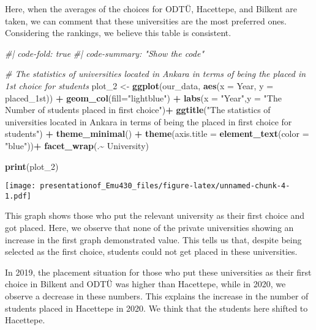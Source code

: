 \documentclass[
]{article}
\newenvironment{Shaded}{\begin{snugshade}}{\end{snugshade}}
\newcommand{\AttributeTok}[1]{\textcolor[rgb]{0.13,0.29,0.53}{#1}}
\newcommand{\CommentTok}[1]{\textcolor[rgb]{0.56,0.35,0.01}{\textit{#1}}}
\newcommand{\FunctionTok}[1]{\textcolor[rgb]{0.13,0.29,0.53}{\textbf{#1}}}
\newcommand{\NormalTok}[1]{#1}
\newcommand{\OtherTok}[1]{\textcolor[rgb]{0.56,0.35,0.01}{#1}}
\newcommand{\SpecialCharTok}[1]{\textcolor[rgb]{0.81,0.36,0.00}{\textbf{#1}}}
\newcommand{\StringTok}[1]{\textcolor[rgb]{0.31,0.60,0.02}{#1}}
\begin{document}
Here, when the averages of the choices for ODTÜ, Hacettepe, and Bilkent
are taken, we can comment that these universities are the most preferred
ones. Considering the rankings, we believe this table is consistent.

\begin{Shaded}
\begin{Highlighting}[]
\CommentTok{\#| code{-}fold: true}
\CommentTok{\#| code{-}summary: "Show the code"}

\CommentTok{\# The statistics of universities located in Ankara in terms of being the placed in 1st choice for students}
\NormalTok{plot\_2 }\OtherTok{\textless{}{-}} \FunctionTok{ggplot}\NormalTok{(our\_data, }\FunctionTok{aes}\NormalTok{(}\AttributeTok{x =}\NormalTok{ Year, }\AttributeTok{y =}\NormalTok{ placed\_1st)) }\SpecialCharTok{+} 
  \FunctionTok{geom\_col}\NormalTok{(}\AttributeTok{fill=}\StringTok{"lightblue"}\NormalTok{) }\SpecialCharTok{+}
 \FunctionTok{labs}\NormalTok{(}\AttributeTok{x =} \StringTok{"Year"}\NormalTok{,}\AttributeTok{y =} \StringTok{"The Number of students placed in first choice"}\NormalTok{)}\SpecialCharTok{+}
  \FunctionTok{ggtitle}\NormalTok{(}\StringTok{"The statistics of universities located in Ankara in terms of being the placed in first choice for students"}\NormalTok{) }\SpecialCharTok{+}
  \FunctionTok{theme\_minimal}\NormalTok{() }\SpecialCharTok{+}
  \FunctionTok{theme}\NormalTok{(}\AttributeTok{axis.title =} \FunctionTok{element\_text}\NormalTok{(}\AttributeTok{color =} \StringTok{"blue"}\NormalTok{))}\SpecialCharTok{+}
  \FunctionTok{facet\_wrap}\NormalTok{(.}\SpecialCharTok{\textasciitilde{}}\NormalTok{ University)}

\FunctionTok{print}\NormalTok{(plot\_2)}
\end{Highlighting}
\end{Shaded}

\texttt{[image: presentationof\_Emu430\_files/figure-latex/unnamed-chunk-4-1.pdf]}

This graph shows those who put the relevant university as their first
choice and got placed. Here, we observe that none of the private
universities showing an increase in the first graph demonstrated value.
This tells us that, despite being selected as the first choice, students
could not get placed in these universities.

In 2019, the placement situation for those who put these universities as
their first choice in Bilkent and ODTÜ was higher than Hacettepe, while
in 2020, we observe a decrease in these numbers. This explains the
increase in the number of students placed in Hacettepe in 2020. We think
that the students here shifted to Hacettepe.
\end{document}
